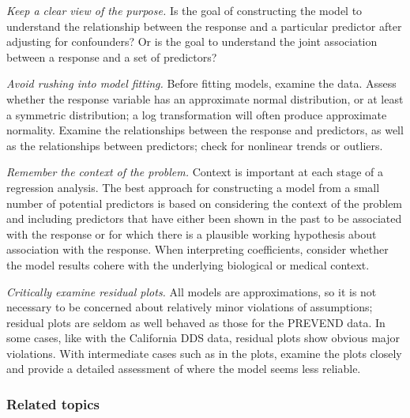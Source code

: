 \begin{description}

	\item \emph{Keep a clear view of the purpose.} Is the goal of constructing the model to understand the relationship between the response and a particular predictor after adjusting for confounders? Or is the goal to understand the joint association between a response and a set of predictors? 
	
	\item \emph{Avoid rushing into model fitting.} Before fitting models, examine the data. Assess whether the response variable has an approximate normal distribution, or at least a symmetric distribution; a log transformation will often produce approximate normality. Examine the relationships between the response and predictors, as well as the relationships between predictors; check for nonlinear trends or outliers. 
	
	\item \emph{Remember the context of the problem.} Context is important at each stage of a regression analysis. The best approach for constructing a model from a small number of potential predictors is based on considering the context of the problem and including predictors that have either been shown in the past to be associated with the response or for which there is a plausible working hypothesis about association with the response. When interpreting coefficients, consider whether the model results cohere with the underlying biological or medical context.
	
	\item \emph{Critically examine residual plots.} All models are approximations, so it is not necessary to be concerned about relatively minor violations of assumptions; residual plots are seldom as well behaved as those for the PREVEND data. In some cases, like with the California DDS data, residual plots show obvious major violations. With intermediate cases such as in the  plots, examine the plots closely and provide a detailed assessment of where the model seems less reliable.

\end{description}

\subsubsection{Related topics}

